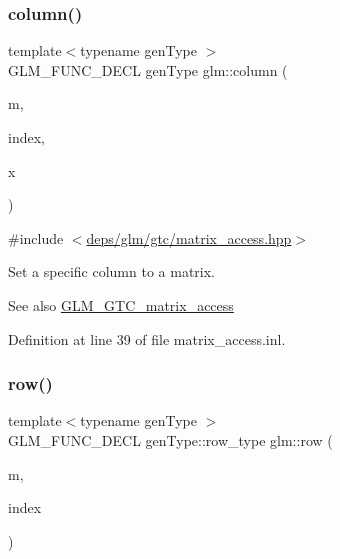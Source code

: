 \subsubsection{\texorpdfstring{column()}{column()}\hspace{0.1cm}{\footnotesize\ttfamily [2/2]}}
{\footnotesize\ttfamily template$<$typename gen\+Type $>$ \\
G\+L\+M\+\_\+\+F\+U\+N\+C\+\_\+\+D\+E\+CL gen\+Type glm\+::column (\begin{DoxyParamCaption}\item[{gen\+Type const \&}]{m,  }\item[{length\+\_\+t}]{index,  }\item[{typename gen\+Type\+::col\+\_\+type const \&}]{x }\end{DoxyParamCaption})}



{\ttfamily \#include $<$\hyperlink{matrix__access_8hpp}{deps/glm/gtc/matrix\+\_\+access.\+hpp}$>$}

Set a specific column to a matrix. \begin{DoxySeeAlso}{See also}
\hyperlink{group__gtc__matrix__access}{G\+L\+M\+\_\+\+G\+T\+C\+\_\+matrix\+\_\+access} 
\end{DoxySeeAlso}


Definition at line 39 of file matrix\+\_\+access.\+inl.

\mbox{\label{group__gtc__matrix__access_ga259e5ebd0f31ec3f83440f8cae7f5dba}} 
\subsubsection{\texorpdfstring{row()}{row()}\hspace{0.1cm}{\footnotesize\ttfamily [1/2]}}
{\footnotesize\ttfamily template$<$typename gen\+Type $>$ \\
G\+L\+M\+\_\+\+F\+U\+N\+C\+\_\+\+D\+E\+CL gen\+Type\+::row\+\_\+type glm\+::row (\begin{DoxyParamCaption}\item[{gen\+Type const \&}]{m,  }\item[{length\+\_\+t}]{index }\end{DoxyParamCaption})}



